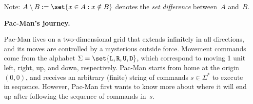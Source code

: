 \documentclass[11pt,addpoints]{exam}
\begin{document}
\begin{questions}
\begin{parts}
    Note: $A \setminus B := \set{x \in A: x \notin B}$ denotes the \emph{set difference} between~$A$ and~$B$.

    
    \begin{solution}
    
    \end{solution}
    
    
  \end{parts}



  \question \textbf{Pac-Man's journey.} \nopagebreak
  
  Pac-Man lives on a two-dimensional grid that extends infinitely in all directions, and its moves are controlled by a mysterious outside force.
  Movement commands come from the alphabet $\Sigma = \set{\mathtt{L}, \mathtt{R}, \mathtt{U}, \mathtt{D}}$, which correspond to moving 1 unit left, right, up, and down, respectively.
  Pac-Man starts from home at the origin $(0,0)$, and receives an arbitrary (finite) string of commands $s \in \Sigma^*$ to execute in sequence.
  However, Pac-Man first wants to know more about where it will end up after following the sequence of commands in~$s$.

\end{questions}
\end{document}
